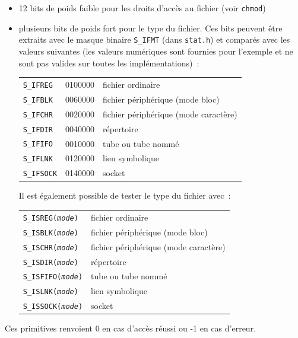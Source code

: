 \documentclass [twoside] {report}
\begin{document}
\begin {itemize}
    \item 12 bits de poids faible pour les droits d'accès au fichier
	(voir \texttt {chmod})
    \item plusieurs bits de poids fort pour le type du fichier. Ces bits
	peuvent être extraits avec le masque binaire \texttt {S\_IFMT} (dans
	\texttt {stat.h}) et comparés avec les valeurs suivantes (les valeurs
	numériques sont fournies pour l'exemple et ne sont pas valides
	sur toutes les implémentations)~:

	\begin {tabular} {|lll|} \hline
	    \texttt {S\_IFREG} & 0100000 & fichier ordinaire \\
	    \texttt {S\_IFBLK} & 0060000 & fichier périphérique (mode bloc) \\
	    \texttt {S\_IFCHR} & 0020000 & fichier périphérique (mode caractère) \\
	    \texttt {S\_IFDIR} & 0040000 & répertoire \\
	    \texttt {S\_IFIFO} & 0010000 & tube ou tube nommé \\
	    \texttt {S\_IFLNK} & 0120000 & lien symbolique \\
	    \texttt {S\_IFSOCK} & 0140000 & socket \\
	    \hline
	\end {tabular}

	Il est également possible de tester le type du fichier avec~:

	\begin {tabular} {|ll|} \hline
	    \texttt {S\_ISREG(\emph {mode})} & fichier ordinaire \\
	    \texttt {S\_ISBLK(\emph {mode})} & fichier périphérique (mode bloc) \\
	    \texttt {S\_ISCHR(\emph {mode})} & fichier périphérique (mode caractère) \\
	    \texttt {S\_ISDIR(\emph {mode})} & répertoire \\
	    \texttt {S\_ISFIFO(\emph {mode})} & tube ou tube nommé \\
	    \texttt {S\_ISLNK(\emph {mode})} & lien symbolique \\
	    \texttt {S\_ISSOCK(\emph {mode})} & socket \\
	    \hline
	\end {tabular}

\end {itemize}

Ces primitives renvoient 0 en cas d'accès réussi
ou -1 en cas d'erreur.
\end{document}
